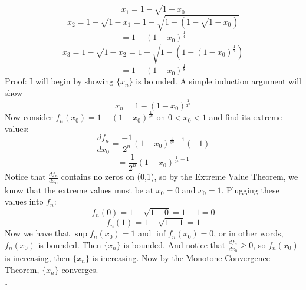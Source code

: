 \documentclass{article}
\begin{document}
\newline\newline
\[x_1 = 1 - \sqrt{1 - x_0}\]
\[x_2 = 1 - \sqrt{1 - x_1} = 1 - \sqrt{1-(1-\sqrt{1-x_0})}\]
\[= 1 - (1-x_0)^{\frac{1}{4}}\]
\[x_3 = 1 - \sqrt{1-x_2} = 1 - \sqrt{1 - (1 - (1-x_0)^{\frac{1}{4}})}\]
\[= 1 - (1-x_0)^{\frac{1}{8}}\]
Proof: I will begin by showing $\{x_n\}$ is bounded. A simple induction argument will show 
\[x_n = 1 - (1-x_0)^{\frac{1}{2^n}}\]
Now consider $f_n(x_0) = 1 - (1 - x_0)^{\frac{1}{2^n}}$ on $0 < x_0 < 1$ and find its extreme values:
\[\frac{df_n}{dx_0} = \frac{-1}{2^n}(1-x_0)^{\frac{1}{2^n}-1}(-1)\]
\[= \frac{1}{2^n}(1-x_0)^{\frac{1}{2^n}-1}\]
Notice that $\frac{df_n}{dx_0}$ contains no zeros on (0,1), so by the Extreme Value Theorem, we know that the extreme values must be at $x_0 = 0$ and $x_0 = 1$. Plugging these values into $f_n$:
\[f_n(0) = 1 - \sqrt{1 - 0} = 1 - 1 = 0\]
\[f_n(1) = 1 - \sqrt{1 - 1} = 1\]
Now we have that $\sup f_n(x_0) = 1$ and $\inf f_n(x_0) = 0$, or in other words, $f_n(x_0)$ is bounded. Then $\{x_n\}$ is bounded. And notice that $\frac{df_n}{dx_0} \geq 0$, so $f_n(x_0)$ is increasing, then $\{x_n\}$ is increasing. Now by the Monotone Convergence Theorem, $\{x_n\}$ converges.
\begin{flushright}
    $\square$
\end{flushright}
\end{document}
